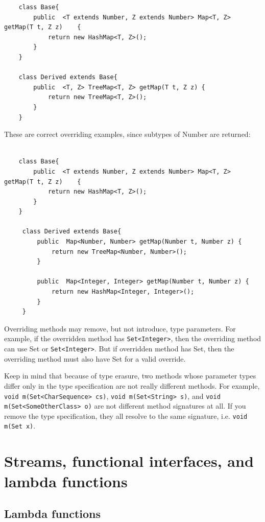 \documentclass{scrartcl}
\begin{document}
\begin{lstlisting}
    class Base{
        public  <T extends Number, Z extends Number> Map<T, Z> getMap(T t, Z z)    {
            return new HashMap<T, Z>();
        }
    }

    class Derived extends Base{
        public  <T, Z> TreeMap<T, Z> getMap(T t, Z z) {
            return new TreeMap<T, Z>();
        }
    }

\end{lstlisting}

These are correct overriding examples, since subtypes of Number are returned:

\begin{lstlisting}

    class Base{
        public  <T extends Number, Z extends Number> Map<T, Z> getMap(T t, Z z)    {
            return new HashMap<T, Z>();
        }
    }

     class Derived extends Base{
         public  Map<Number, Number> getMap(Number t, Number z) {
             return new TreeMap<Number, Number>();
         }

         public  Map<Integer, Integer> getMap(Number t, Number z) {
             return new HashMap<Integer, Integer>();
         }
     }

\end{lstlisting}


Overriding methods may remove, but not introduce, type parameters. For example, if the overridden method has \lstinline|Set<Integer>|, then the overriding method can use Set or \lstinline|Set<Integer>|. But if overridden method has Set, then the overriding method must also have Set for a valid override.

Keep in mind that because of type erasure, two methods whose parameter types differ only in the type specification are not really different methods. For example, \lstinline|void m(Set<CharSequence> cs)|, \lstinline|void m(Set<String> s)|, and \lstinline|void m(Set<SomeOtherClass> o)| are not different method signatures at all. If you remove the type specification, they all resolve to the same signature, i.e. \lstinline|void m(Set x)|.


\section{Streams, functional interfaces, and lambda functions}
\subsection{Lambda functions}
\end{document}
